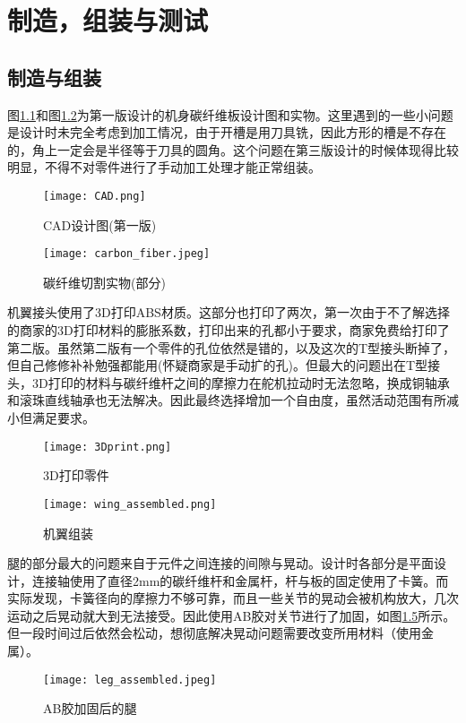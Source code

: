 
\chapter{制造，组装与测试}
\label{cha:chapter03}
\section{制造与组装}
图\ref{fig:CAD}和图\ref{fig:carbon_fiber}为第一版设计的机身碳纤维板设计图和实物。这里遇到的一些小问题是设计时未完全考虑到加工情况，由于开槽是用刀具铣，因此方形的槽是不存在的，角上一定会是半径等于刀具的圆角。这个问题在第三版设计的时候体现得比较明显，不得不对零件进行了手动加工处理才能正常组装。
\begin{figure}[H]
  \centering%
  \texttt{[image: CAD.png]}
  \caption{CAD设计图(第一版)}
  \label{fig:CAD}
\end{figure}
\begin{figure}[H]
  \centering%
  \texttt{[image: carbon\_fiber.jpeg]}
  \caption{碳纤维切割实物(部分)}
  \label{fig:carbon_fiber}
\end{figure}
机翼接头使用了3D打印ABS材质。这部分也打印了两次，第一次由于不了解选择的商家的3D打印材料的膨胀系数，打印出来的孔都小于要求，商家免费给打印了第二版。虽然第二版有一个零件的孔位依然是错的，以及这次的T型接头断掉了，但自己修修补补勉强都能用(怀疑商家是手动扩的孔)。但最大的问题出在T型接头，3D打印的材料与碳纤维杆之间的摩擦力在舵机拉动时无法忽略，换成铜轴承和滚珠直线轴承也无法解决。因此最终选择增加一个自由度，虽然活动范围有所减小但满足要求。
\begin{figure}[H]
  \centering%
  \texttt{[image: 3Dprint.png]}
  \caption{3D打印零件}
  \label{fig:3Dprint}
\end{figure}
\begin{figure}[H]
  \centering%
  \texttt{[image: wing\_assembled.png]}
  \caption{机翼组装}
  \label{fig:wing_assembled}
\end{figure}
腿的部分最大的问题来自于元件之间连接的间隙与晃动。设计时各部分是平面设计，连接轴使用了直径2mm的碳纤维杆和金属杆，杆与板的固定使用了卡簧。而实际发现，卡簧径向的摩擦力不够可靠，而且一些关节的晃动会被机构放大，几次运动之后晃动就大到无法接受。因此使用AB胶对关节进行了加固，如图\ref{fig:leg_assembled}所示。但一段时间过后依然会松动，想彻底解决晃动问题需要改变所用材料（使用金属）。
\begin{figure}[H]
  \centering%
  \texttt{[image: leg\_assembled.jpeg]}
  \caption{AB胶加固后的腿}
  \label{fig:leg_assembled}
\end{figure}
